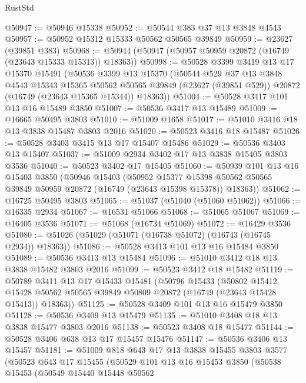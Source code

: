 \begin{lexlean}{RustStd}
\begin{coremodule}
@50947 := @50946 @15338
@50952 := @50544 @383 @37 @13 @3848 @4543
@50957 := @50952 @15312 @15333 @50562 @50565 @39849
@50959 := @23627 (@39851 @383)
@50968 := @50944 (@50947 (@50957 @50959 @20872 (@16749 (@23643 @15333 @15313)) @18363))
@50998 := @50528
    @3399
    @3419
    @13
    @17
    @15370
    @15491
    (@50536
      @3399
      @13
      @15370
      (@50544
        @529
        @37
        @13
        @3848
        @4543
        @15343
        @15365
        @50562
        @50565
        @39849
        (@23627 (@39851 @529))
        @20872
        (@16749 (@23643 @15365 @15344))
        @18363))
@51004 := @50528 @3417 @101 @13 @16 @15489 @3850
@51007 := @50536 @3417 @13 @15489
@51009 := @16665 @50495 @3803
@51010 := @51009 @1658
@51017 := @51010 @3416 @18 @13 @3838 @15487 @3803 @2016
@51020 := @50523 @3416 @18 @15487
@51026 := @50528 @3403 @3415 @13 @17 @15407 @15486
@51029 := @50536 @3403 @13 @15407
@51037 := @51009 @2934 @3402 @17 @13 @3838 @15405 @3803 @3536
@51040 := @50523 @3402 @17 @15405
@51060 := @50939
    @101
    @13
    @16
    @15403
    @3850
    (@50946
      @15403
      (@50952
        @15377
        @15398
        @50562
        @50565
        @39849
        @50959
        @20872
        (@16749 (@23643 @15398 @15378))
        @18363))
@51062 := @16725 @50495 @3803
@51065 := @51037 (@51040 (@51060 @51062))
@51066 := @16335 @2934
@51067 := @16531 @51066
@51068 := @51065 @51067
@51069 := @16405 @3536
@51071 := @51068 (@16734 @51069)
@51072 := @16429 @3536
@51080 := @51026 (@51029 (@51071 (@16738 @51072) (@16743 (@16745 @2934)) @18363))
@51086 := @50528 @3413 @101 @13 @16 @15484 @3850
@51089 := @50536 @3413 @13 @15484
@51096 := @51010 @3412 @18 @13 @3838 @15482 @3803 @2016
@51099 := @50523 @3412 @18 @15482
@51119 := @50789
    @3411
    @13
    @17
    @15433
    @15481
    (@50796
      @15433
      (@50802
        @15412
        @15428
        @50562
        @50565
        @39849
        @50809
        @20872
        (@16749 (@23643 @15428 @15413))
        @18363))
@51125 := @50528 @3409 @101 @13 @16 @15479 @3850
@51128 := @50536 @3409 @13 @15479
@51135 := @51010 @3408 @18 @13 @3838 @15477 @3803 @2016
@51138 := @50523 @3408 @18 @15477
@51144 := @50528 @3406 @638 @13 @17 @15457 @15476
@51147 := @50536 @3406 @13 @15457
@51181 := @51009
    @818
    @643
    @17
    @13
    @3838
    @15455
    @3803
    @3577
    (@50523
      @643
      @17
      @15455
      (@50529
        @101
        @13
        @16
        @15453
        @3850
        (@50538
          @15453
          (@50549
            @15440
            @15448
            @50562

\end{coremodule}
\end{lexlean}
